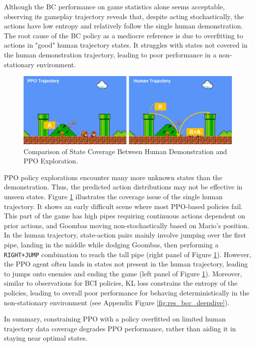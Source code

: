 \documentclass{article}
\begin{document}
Although the BC performance on game statistics alone seems acceptable, 
observing its gameplay trajectory reveals that, despite acting stochastically, 
the actions have low entropy and relatively follow the single human 
demonstration. The root cause of the BC policy as a mediocre reference is 
due to overfitting to actions in "good" human trajectory states. It struggles 
with states not covered in the human demonstration trajectory, leading to 
poor performance in a non-stationary environment.

\begin{figure}[htbp]
      \centering
      \includegraphics[width=\columnwidth]{figures/gamevisual.png}
      \caption{Comparison of State Coverage Between Human Demonstration 
      and PPO Exploration.}
      \label{fig:game}
\end{figure}

PPO policy explorations encounter many more unknown states than the 
demonstration. Thus, the predicted action distributions may not be effective 
in unseen states. Figure \ref{fig:game} illustrates the coverage issue of the 
single human trajectory. It shows an early difficult scene where most PPO-based 
policies fail. This part of the game has high pipes requiring continuous 
actions dependent on prior actions, and Goombas moving non-stochastically 
based on Mario's position. In the human trajectory, state-action pairs 
mainly involve jumping over the first pipe, landing in the middle while 
dodging Goombas, then performing a \texttt{RIGHT+JUMP} combination to reach the 
tall pipe (right panel of Figure \ref{fig:game}). However, the PPO agent 
often lands in states not present in the human trajectory, leading to 
jumps onto enemies and ending the game (left panel of Figure \ref{fig:game}).
Moreover, similar to observations for BCI policies, KL loss constrains the 
entropy of the policies, leading to overall poor performance for behaving 
deterministically in the non-stationary environment (see
Appendix Figure \ref{fig:res_bcc_deepdive}).

In summary, constraining PPO with a policy overfitted on limited human 
trajectory data coverage degrades PPO performance, rather than aiding 
it in staying near optimal states.
\end{document}
